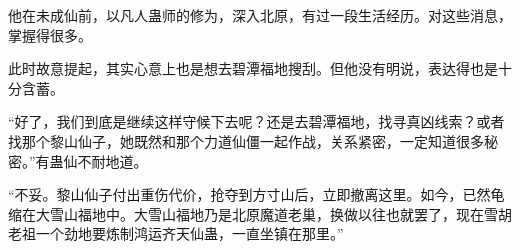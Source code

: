 \begin{this_body}
他在未成仙前，以凡人蛊师的修为，深入北原，有过一段生活经历。对这些消息，掌握得很多。

此时故意提起，其实心意上也是想去碧潭福地搜刮。但他没有明说，表达得也是十分含蓄。

“好了，我们到底是继续这样守候下去呢？还是去碧潭福地，找寻真凶线索？或者找那个黎山仙子，她既然和那个力道仙僵一起作战，关系紧密，一定知道很多秘密。”有蛊仙不耐地道。

“不妥。黎山仙子付出重伤代价，抢夺到方寸山后，立即撤离这里。如今，已然龟缩在大雪山福地中。大雪山福地乃是北原魔道老巢，换做以往也就罢了，现在雪胡老祖一个劲地要炼制鸿运齐天仙蛊，一直坐镇在那里。”

\end{this_body}

